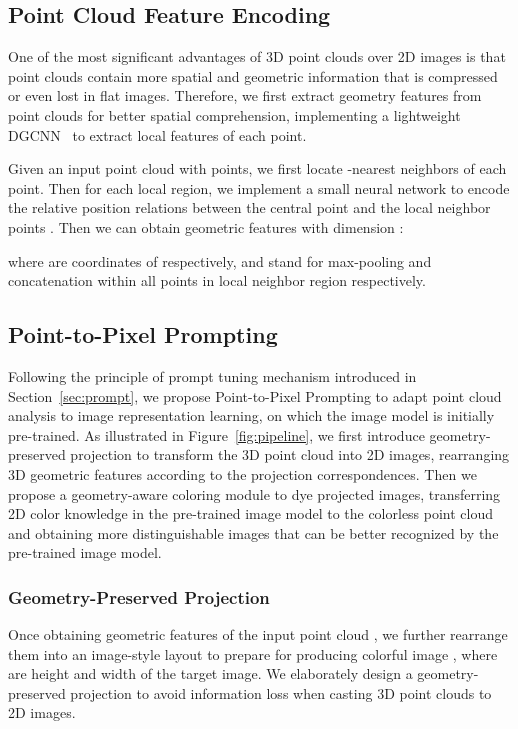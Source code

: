 \documentclass{article}
\begin{document}
\subsection{Point Cloud Feature Encoding}

One of the most significant advantages of 3D point clouds over 2D images is that point clouds contain more spatial and geometric information that is compressed or even lost in flat images. Therefore, we first extract geometry features from point clouds for better spatial comprehension, implementing a lightweight DGCNN~\cite{wang2019dgcnn} to extract local features of each point. 

Given an input point cloud  with  points, we first locate -nearest neighbors  of each point. Then for each local region, we implement a small neural network  to encode the relative position relations between the central point  and the local neighbor points . Then we can obtain geometric features  with dimension :

where  are coordinates of  respectively,  and  stand for max-pooling and concatenation within all points  in local neighbor region  respectively. 

\subsection{Point-to-Pixel Prompting}
\label{sec:nrp}

Following the principle of prompt tuning mechanism introduced in Section~\ref{sec:prompt}, we propose Point-to-Pixel Prompting to adapt point cloud analysis to image representation learning, on which the image model is initially pre-trained. As illustrated in Figure~\ref{fig:pipeline}, we first introduce geometry-preserved projection to transform the 3D point cloud into 2D images, rearranging 3D geometric features according to the projection correspondences. Then we propose a geometry-aware coloring module to dye projected images, transferring 2D color knowledge in the pre-trained image model to the colorless point cloud and obtaining more distinguishable images that can be better recognized by the pre-trained image model. 

\subsubsection{Geometry-Preserved Projection}
\label{sec:proj}

Once obtaining geometric features  of the input point cloud , we further rearrange them into an image-style layout  to prepare for producing colorful image , where  are height and width of the target image. We elaborately design a geometry-preserved projection to avoid information loss when casting 3D point clouds to 2D images.
\end{document}
